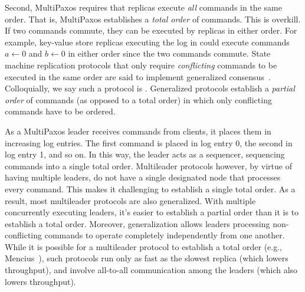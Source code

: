 Second, MultiPaxos requires that replicas execute \emph{all} commands in the
same order. That is, MultiPaxos establishes a \emph{total order} of commands.
This is overkill. If two commands commute, they can be executed by replicas in
either order. For example, key-value store replicas executing the log in
 could execute commands $a \gets 0$ and $b
\gets 0$ in either order since the two commands commute. State machine
replication protocols that only require \emph{conflicting} commands to be
executed in the same order are said to implement generalized
consensus~\cite{lamport2005generalized}. Colloquially, we say such a protocol
is . Generalized protocols establish a \emph{partial
order} of commands (as opposed to a total order) in which only conflicting
commands have to be ordered.

As a MultiPaxos leader receives commands from clients, it places them in
increasing log entries. The first command is placed in log entry 0, the second
in log entry 1, and so on. In this way, the leader acts as a sequencer,
sequencing commands into a single total order. Multileader protocols however, by
virtue of having multiple leaders, do not have a single designated node that
processes every command. This makes it challenging to establish a single total
order. As a result, most multileader protocols are also generalized. With
multiple concurrently executing leaders, it's easier to establish a partial
order than it is to establish a total order. Moreover, generalization allows
leaders processing non-conflicting commands to operate completely independently
from one another. While it is possible for a multileader protocol to establish
a total order (e.g., Mencius~\cite{mao2008mencius}), such protocols run only as
fast as the slowest replica (which lowers throughput), and involve all-to-all
communication among the leaders (which also lowers throughput).
